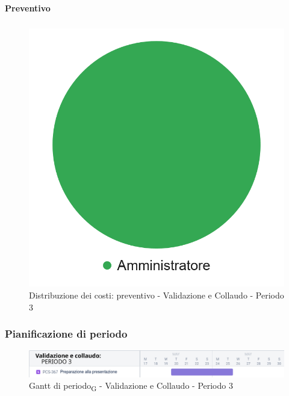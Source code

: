 \paragraph{Preventivo}
\subparagraph*{}


\hspace{-1cm}
\begin{minipage}{.50\textwidth}
\smallPreventivoTable{
	
}
\end{minipage}
\hspace{1cm}
\begin{minipage}{.40\textwidth}
\begin{figure}[H]
	\includegraphics[scale=0.21]{res/images/charts/preventivo_priori/Grafico4-11.png}
	\caption{Distribuzione dei costi: preventivo - Validazione e Collaudo - Periodo 3}
\end{figure}
\end{minipage} 


\subsubsection{Pianificazione di periodo}


\begin{figure}[H]
	\centering
	\includegraphics[scale=0.55]{res/images/gantt_periodo/valid_3_gantt.png}
	\caption{Gantt di periodo\textsubscript{G} - Validazione e Collaudo - Periodo 3}
\end{figure}

